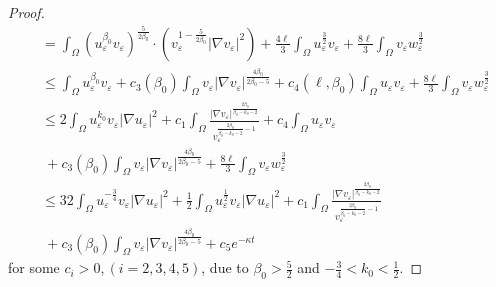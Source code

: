 \documentclass[10pt,a4paper]{amsart}
\begin{document}
\begin{proof}
\begin{align}
        &= \int_\Omega (u_\varepsilon^{\beta_0}v_\varepsilon)^{\frac{5}{2\beta_0}}\cdot(v_\varepsilon^{1-\frac{5}{2\beta_0}}|\nabla v_\varepsilon|^{2})+\frac{4\ell}{3}\int_\Omega u_\varepsilon ^{\frac{3}{2}}v_\varepsilon+\frac{8\ell}{3}\int_\Omega v_\varepsilon w_\varepsilon^{\frac3 2}\nonumber\\
        &\leq \int_\Omega u_\varepsilon^{\beta_0}v_\varepsilon+c_3(\beta_0)\int_\Omega v_\varepsilon|\nabla v_\varepsilon|^{\frac{4\beta_0}{2\beta_0-5}}+c_4(\ell,\beta_0)\int_\Omega u_\varepsilon v_\varepsilon+\frac{8\ell}{3}\int_\Omega v_\varepsilon w_\varepsilon^{\frac3 2}\nonumber\\
        &\leq 2\int_{\Omega}u_\varepsilon^{k_0}v_\varepsilon|\nabla u_\varepsilon|^2+
        c_1\int_\Omega\frac{|\nabla v_\varepsilon|^{\frac{2\beta_0}{\beta_0-k_0-2}}}
        {v_\varepsilon^{\frac{2\beta_0}{\beta_0-k_0-2}-1}}
                 +c_4\int_{\Omega}u_\varepsilon v_\varepsilon\\
        &~+c_3(\beta_0)\int_\Omega v_\varepsilon|\nabla v_\varepsilon|^{\frac{4\beta_0}{2\beta_0-5}}+\frac{8\ell}{3}\int_\Omega v_\varepsilon w_\varepsilon^{\frac3 2}\nonumber\\
       &\leq 32 \int_\Omega u_\varepsilon^{-\frac{3}{4}}v_\varepsilon|\nabla u_\varepsilon|^2+
       \frac 12 \int_\Omega u_\varepsilon^{\frac{1}{2}}v_\varepsilon|\nabla u_\varepsilon|^2+
        c_1\int_\Omega\frac{|\nabla v_\varepsilon|^{\frac{2\beta_0}{\beta_0-k_0-2}}}
        {v_\varepsilon^{\frac{2\beta_0}{\beta_0-k_0-2}-1}}\nonumber\\
           &~+c_3(\beta_0)\int_\Omega v_\varepsilon|\nabla v_\varepsilon|^{\frac{4\beta_0}{2\beta_0-5}}+c_5e^{-\kappa t}\nonumber
\end{align}
for some $c_i>0, (i=2,3,4,5)$, due to $\beta_0>\frac 52$ and $-\frac 34<k_0<\frac 12$.


\end{proof}
\end{document}
